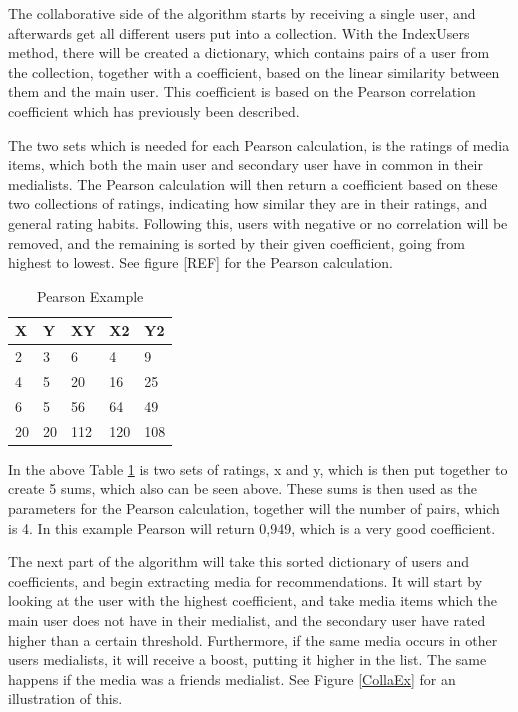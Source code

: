 The collaborative side of the algorithm starts by receiving a single user, and afterwards get all different users put into a collection. With the IndexUsers method, there will be created a dictionary, which contains pairs of a user from the collection, together with a coefficient, based on the linear similarity between them and the main user. This coefficient is based on the Pearson correlation coefficient which has previously been described.

The two sets which is needed for each Pearson calculation, is the ratings of media items, which both the main user and secondary user have in common in their medialists. The Pearson calculation will then return a coefficient based on these two collections of ratings, indicating how similar they are in their ratings, and general rating habits. Following this, users with negative or no correlation will be removed, and the remaining is sorted by their given coefficient, going from highest to lowest. See figure [REF] for the Pearson calculation.
\begin{table}[htb]
\centering
\begin{tabular}{|l|l|l|l|l|} \hline
	\textbf{X} & \textbf{Y} & \textbf{XY}
	& \textbf{X2} & \textbf{Y2} \\ \hline
	2 & 3 & 6 & 4 & 9 \\ \hline
	4 & 5 & 20 & 16 & 25 \\ \hline
	6 & 5 & 56 & 64 & 49 \\ \hline\hline
	20 & 20 & 112 & 120 & 108 \\ \hline
\end{tabular}
\caption{Pearson Example}
\label{PearsonEx}
\end{table} 

In the above Table \ref{PearsonEx} is two sets of ratings, x and y, which is then put together to create 5 sums, which also can be seen above. These sums is then used as the parameters for the Pearson calculation, together will the number of pairs, which is 4. In this example Pearson will return 0,949, which is a very good coefficient.

The next part of the algorithm will take this sorted dictionary of users and coefficients, and begin extracting media for recommendations. It will start by looking at the user with the highest coefficient, and take media items which the main user does not have in their medialist, and the secondary user have rated higher than a certain threshold. Furthermore, if the same media occurs in other users medialists, it will receive a boost, putting it higher in the list. The same happens if the media was a friends medialist. See Figure \ref{CollaEx} for an illustration of this.

